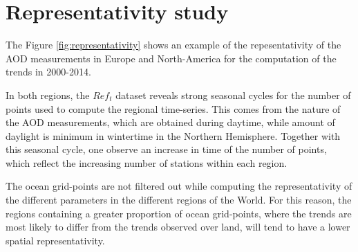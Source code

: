 \documentclass[journal abbreviation, manuscript]{copernicus}
\begin{document}




\appendix
\section{Representativity study} \label{sec:representativity} %

The Figure \ref{fig:representativity} shows an example of the repesentativity of the AOD measurements in Europe and North-America for the computation of the trends in 2000-2014.

In both regions, the $Ref_{t}$ dataset reveals strong seasonal cycles for the number of points used to compute the regional time-series. This comes from the nature of the AOD measurements, which are obtained during daytime, while amount of daylight is minimum in wintertime in the Northern Hemisphere. Together with this seasonal cycle, one observe an increase in time of the number of points, which reflect the increasing number of stations within each region.

The ocean grid-points are not filtered out while computing the representativity of the different parameters in the different regions of the World. For this reason, the regions containing a greater proportion of ocean grid-points, where the trends are most likely to differ from the trends observed over land, will tend to have a lower spatial representativity.

\subsection{}     %


\noappendix       %



\end{document}
